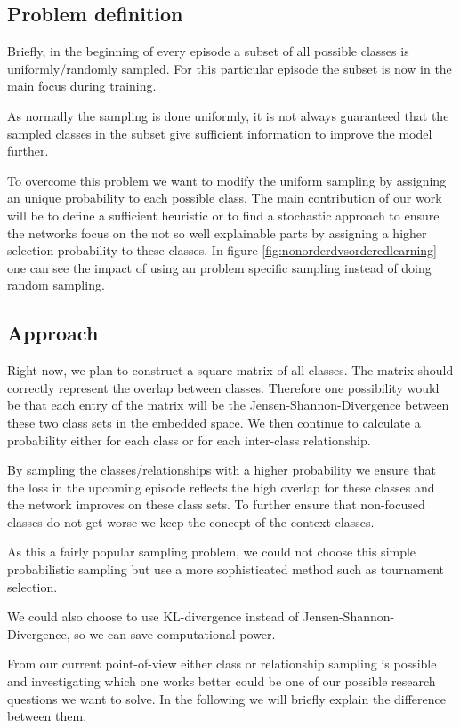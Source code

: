 \subsection{Problem definition}
Briefly, in the beginning of every episode a subset of all possible classes is uniformly/randomly sampled. For this particular episode the subset is now in the main focus during training.

As normally the sampling is done uniformly, it is not always guaranteed that the sampled classes in the subset give sufficient information to improve the model further. 

To overcome this problem we want to modify the uniform sampling by assigning an unique probability to each possible class. The main contribution of our work will be to define a sufficient heuristic or to find a stochastic approach to ensure the networks focus on the not so well explainable parts by assigning a higher selection probability to these classes.
In figure \ref{fig:nonorderdvsorderedlearning} one can see the impact of using an problem specific sampling instead of doing random sampling.

\subsection{Approach}
Right now, we plan to construct a square matrix of all classes. The matrix should correctly represent the overlap between classes. Therefore one possibility would be that each entry of the matrix will be the Jensen-Shannon-Divergence between these two class sets in the embedded space. We then continue to calculate a probability either for each class or for each inter-class relationship.

By sampling the classes/relationships with a higher probability we ensure that the loss in the upcoming episode reflects the high overlap for these classes and the network improves on these class sets. To further ensure that non-focused classes do not get worse we keep the concept of the context classes.

As this a fairly popular sampling problem, we could not choose this simple probabilistic sampling but use a more sophisticated method such as tournament selection.

We could also choose to use KL-divergence instead of Jensen-Shannon-Divergence, so we can save computational power.

From our current point-of-view either class or relationship sampling is possible and investigating which one works better could be one of our possible research questions we want to solve. In the following we will briefly explain the difference between them.


